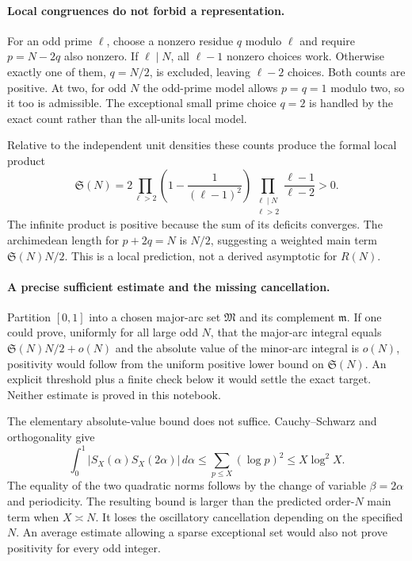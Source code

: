 \documentclass[11pt,a4paper]{article}
\begin{document}
\paragraph{Local congruences do not forbid a representation.}
For an odd prime $\ell$, choose a nonzero residue $q$ modulo $\ell$
and require $p=N-2q$ also nonzero. If $\ell\mid N$, all $\ell-1$
nonzero choices work. Otherwise exactly one of them, $q=N/2$, is
excluded, leaving $\ell-2$ choices. Both counts are positive. At two,
for odd $N$ the odd-prime model allows $p=q=1$ modulo two, so it too
is admissible. The exceptional small prime choice $q=2$ is handled
by the exact count rather than the all-units local model.

Relative to the independent unit densities these counts produce the
formal local product
\[
 \mathfrak S(N)=2\prod_{\ell>2}\left(1-\frac1{(\ell-1)^2}\right)
               \prod_{\substack{\ell\mid N\\\ell>2}}
                    \frac{\ell-1}{\ell-2}>0.
\]
The infinite product is positive because the sum of its deficits
converges. The archimedean length for $p+2q=N$ is $N/2$, suggesting
a weighted main term $\mathfrak S(N)N/2$. This is a local prediction,
not a derived asymptotic for $R(N)$.

\paragraph{A precise sufficient estimate and the missing cancellation.}
Partition $[0,1]$ into a chosen major-arc set $\mathfrak M$ and its
complement $\mathfrak m$. If one could prove, uniformly for all large
odd $N$, that the major-arc integral equals
$\mathfrak S(N)N/2+o(N)$ and the absolute value of the minor-arc
integral is $o(N)$, positivity would follow from the uniform positive
lower bound on $\mathfrak S(N)$. An explicit threshold plus a finite
check below it would settle the exact target. Neither estimate is
proved in this notebook.

The elementary absolute-value bound does not suffice. Cauchy--Schwarz
and orthogonality give
\[
 \int_0^1|S_X(\alpha)S_X(2\alpha)|\,d\alpha
 \le\sum_{p\le X}(\log p)^2\le X\log^2X.
\]
The equality of the two quadratic norms follows by the change of
variable $\beta=2\alpha$ and periodicity. The resulting bound is
larger than the predicted order-$N$ main term when $X\asymp N$.
It loses the oscillatory cancellation depending on the specified $N$.
An average estimate allowing a sparse exceptional set would also not
prove positivity for every odd integer.
\end{document}
